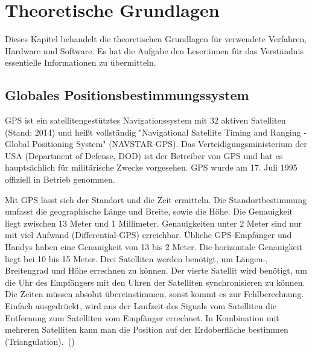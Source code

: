 \section{Theoretische Grundlagen}
\label{sec:theoretGrundl}
Dieses Kapitel behandelt die theoretischen Grundlagen für verwendete Verfahren, Hardware und Software. Es hat die Aufgabe den Leser:innen für das Verständnis essentielle Informationen zu übermitteln.
\subsection{Globales Positionsbestimmungssystem}
\label{subsec:tGPS}
\glqq GPS ist ein satellitengestütztes Navigationssystem mit 32 aktiven Satelliten (Stand: 2014) und heißt vollständig "Navigational Satellite Timing and Ranging - Global Positioning System" (NAVSTAR-GPS). Das Verteidigungsministerium der USA (Department of Defense, DOD) ist der Betreiber von GPS und hat es hauptsächlich für militärische Zwecke vorgesehen. GPS wurde am 17. Juli 1995 offiziell in Betrieb genommen.

Mit GPS lässt sich der Standort und die Zeit ermitteln. Die Standortbestimmung umfasst die geographische Länge und Breite, sowie die Höhe. Die Genauigkeit liegt zwischen 13 Meter und 1 Millimeter. Genauigkeiten unter 2 Meter sind nur mit viel Aufwand (Differential-GPS) erreichbar. Übliche GPS-Empfänger und Handys haben eine Genauigkeit von 13 bis 2 Meter. Die horizontale Genauigkeit liegt bei 10 bis 15 Meter.
Drei Satelliten werden benötigt, um Längen-, Breitengrad und Höhe errechnen zu können. Der vierte Satellit wird benötigt, um die Uhr des Empfängers mit den Uhren der Satelliten synchronisieren zu können. Die Zeiten müssen absolut übereinstimmen, sonst kommt es zur Fehlberechnung.
Einfach ausgedrückt, wird aus der Laufzeit des Signals vom Satelliten die Entfernung zum Satelliten vom Empfänger errechnet. In Kombination mit mehreren Satelliten kann man die Position auf der Erdoberfläche bestimmen (Triangulation).\grqq \ 
(\cite{schnabelGPS})

